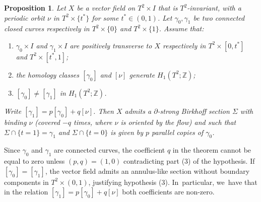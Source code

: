 \documentclass[10pt]{amsart}
\newtheorem{prop}[theorem]{Proposition}
\theoremstyle{definition}
\begin{document}
\begin{prop}\label{prop:helix}
Let $X$ be a vector field on $T^2\times I$ that is $T^2$-invariant, with a periodic orbit $\nu$ in $T^2\times \{t^*\}$ for some $t^*\in(0,1)$. Let $\gamma_0,\gamma_1$ be two connected closed curves respectively in $T^2 \times \{0\}$ and $T^2\times \{1\}$. Assume that:
\begin{enumerate}
\item $\gamma_0\times I$ and $\gamma_1\times I$ are positively transverse to $X$ respectively in $T^2\times [0,t^*]$ and $T^2 \times [t^*,1]$;
\item the homology classes $[\gamma_0]$ and $[\nu]$ generate $H_1(T^2;\mathbb{Z})$;
\item $[\gamma_0]\neq [\gamma_1]$ in $H_1(T^2;\mathbb{Z})$.
\end{enumerate}
Write $[\gamma_1]= p [\gamma_0] + q [\nu]$. Then $X$ admits a $\partial$-strong Birkhoff section $\Sigma$ with binding $\nu$ (covered $-q$ times, where $\nu$ is oriented by the flow) and such that $\Sigma\cap \{t=1\}=\gamma_1$ and $\Sigma \cap \{t=0\}$ is given by $p$ parallel copies of $\gamma_0$.
\end{prop}

{Since $\gamma_0$ and $\gamma_1$ are connected curves, the coefficient $q$ in the theorem cannot be equal to zero unless $(p,q)=(1,0)$ contradicting part (3) of the hypothesis.} If $[\gamma_0]=[\gamma_1]$, the vector field admits an annulus-like section without boundary components in $T^2\times (0,1)$, justifying hypothesis (3). In~particular, we~have that in the relation $[\gamma_1]= p [\gamma_0] + q [\nu]$ both coefficients are non-zero.
\end{document}
